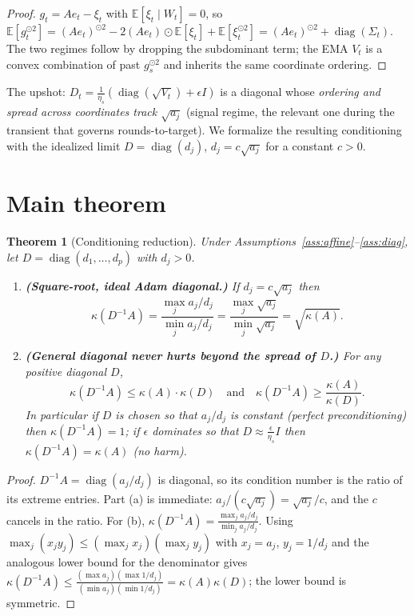 \documentclass[11pt]{article}
\newtheorem{theorem}{Theorem}
\theoremstyle{definition}
\DeclareMathOperator{\diag}{diag}
\newcommand{\E}{\mathbb{E}}
\begin{document}
\begin{proof}
$g_t=Ae_t-\xi_t$ with $\E[\xi_t\mid W_t]=0$, so
$\E[g_t^{\odot2}]=(Ae_t)^{\odot2}-2(Ae_t)\odot\E[\xi_t]+\E[\xi_t^{\odot2}]
=(Ae_t)^{\odot2}+\diag(\Sigma_t)$. The two regimes follow by dropping the
subdominant term; the EMA $V_t$ is a convex combination of past
$g_s^{\odot2}$ and inherits the same coordinate ordering.
\end{proof}

The upshot: $D_t=\frac1{\eta_s}(\diag(\sqrt{V_t})+\epsilon I)$ is a diagonal whose
\emph{ordering and spread across coordinates track $\sqrt{a_j}$} (signal regime,
the relevant one during the transient that governs rounds-to-target). We
formalize the resulting conditioning with the idealized limit
$D=\diag(d_j)$, $d_j=c\sqrt{a_j}$ for a constant $c>0$.

\section{Main theorem}

\begin{theorem}[Conditioning reduction]\label{thm:main}
Under Assumptions~\ref{ass:affine}--\ref{ass:diag}, let
$D=\diag(d_1,\dots,d_p)$ with $d_j>0$.
\begin{enumerate}
\item[(a)] \textbf{(Square-root, ideal Adam diagonal.)} If $d_j=c\sqrt{a_j}$ then
\[
  \kappa(D^{-1}A)=\frac{\max_j a_j/d_j}{\min_j a_j/d_j}
  =\frac{\max_j\sqrt{a_j}}{\min_j\sqrt{a_j}}=\sqrt{\kappa(A)} .
\]
\item[(b)] \textbf{(General diagonal never hurts beyond the spread of $D$.)}
For any positive diagonal $D$,
\[
  \kappa(D^{-1}A)\le \kappa(A)\cdot\kappa(D)\quad\text{and}\quad
  \kappa(D^{-1}A)\ge \frac{\kappa(A)}{\kappa(D)} .
\]
In particular if $D$ is chosen so that $a_j/d_j$ is constant (perfect
preconditioning) then $\kappa(D^{-1}A)=1$; if $\epsilon$ dominates so that
$D\approx \frac{\epsilon}{\eta_s}I$ then $\kappa(D^{-1}A)=\kappa(A)$ (no harm).
\end{enumerate}
\end{theorem}

\begin{proof}
$D^{-1}A=\diag(a_j/d_j)$ is diagonal, so its condition number is the ratio of its
extreme entries. Part (a) is immediate: $a_j/(c\sqrt{a_j})=\sqrt{a_j}/c$, and the
$c$ cancels in the ratio. For (b), $\kappa(D^{-1}A)=\frac{\max_j a_j/d_j}{\min_j
a_j/d_j}$. Using $\max_j(x_j y_j)\le(\max_j x_j)(\max_j y_j)$ with $x_j=a_j$,
$y_j=1/d_j$ and the analogous lower bound for the denominator gives
$\kappa(D^{-1}A)\le\frac{(\max a_j)(\max 1/d_j)}{(\min a_j)(\min 1/d_j)}
=\kappa(A)\kappa(D)$; the lower bound is symmetric.
\end{proof}
\end{document}

